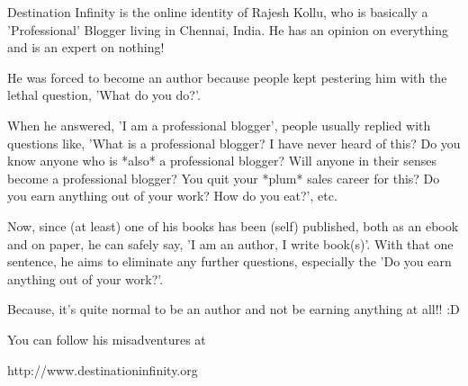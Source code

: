 
Destination Infinity is the online identity of Rajesh Kollu, who is basically a
'Professional' Blogger living in Chennai, India. He has an opinion on everything
and is an expert on nothing!

He was forced to become an author because people kept pestering him with the
lethal question, 'What do you do?'.

When he answered, 'I am a professional blogger', people usually replied with
questions like, 'What is a professional blogger? I have never heard of this? Do
you know anyone who is *also* a professional blogger? Will anyone in their
senses become a professional blogger? You quit your *plum* sales career for
this? Do you earn anything out of your work? How do you eat?', etc.

Now, since (at least) one of his books has been (self) published, both as an
ebook and on paper, he can safely
say, 'I am an author, I write book(s)'. With that one sentence, he aims to
eliminate any further questions, especially the 'Do you earn anything out of
your work?'.

Because, it's quite normal to be an author and not be earning anything at all!!
:D

You can follow his misadventures at

\vspace{1ex}
\centerline{http://www.destinationinfinity.org}

